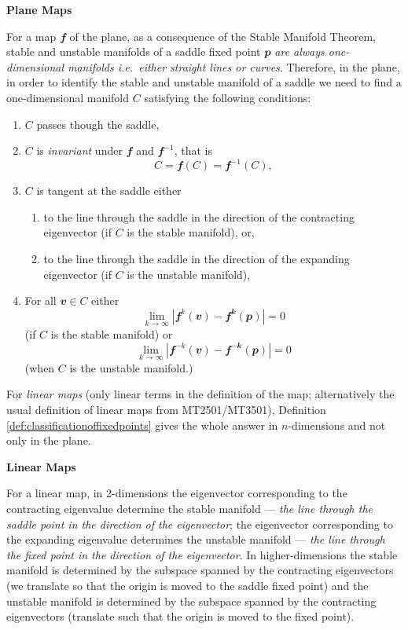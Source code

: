 \documentclass[
  a4paper,
  oneside,
  final]{krantz}
\providecommand{\tightlist}{%
  \setlength{\itemsep}{0pt}\setlength{\parskip}{0pt}}
\renewcommand{\v}[1]{{\mathbfit{#1}}}
\theoremstyle{definition}
\theoremstyle{definition}
\theoremstyle{definition}
\theoremstyle{definition}
\theoremstyle{remark}
\begin{document}
\begin{palegreenbox}

\textbf{Plane Maps}

For a map \(\v{f}\) of the plane, as a consequence of the Stable Manifold Theorem, stable and unstable manifolds of a saddle fixed point \(\v{p}\) \emph{are always one-dimensional manifolds i.e.~either straight lines or curves}. Therefore, in the plane, in order to identify the stable and unstable manifold of a saddle we need to find a one-dimensional manifold \(C\) satisfying the following conditions:

\begin{enumerate}
\def\labelenumi{\arabic{enumi}.}
\tightlist
\item
  \(C\) passes though the saddle,
\item
  \(C\) is \emph{invariant} under \(\v{f}\) and \(\v{f}^{-1}\), that is
  \[C = \v{f}(C) = \v{f}^{-1}(C),\]
\item
  \(C\) is tangent at the saddle either

  \begin{enumerate}
  \def\labelenumii{\roman{enumii}.}
  \tightlist
  \item
    to the line through the saddle in the direction of the contracting eigenvector (if \(C\) is the stable manifold), or,
  \item
    to the line through the saddle in the direction of the expanding eigenvector (if \(C\) is the unstable manifold),
  \end{enumerate}
\item
  For all \(\v{v} \in C\) either
  \[\lim_{k \to \infty} |\v{f}^{k}(\v{v}) - \v{f^{k}}(\v{p})| = 0\] (if \(C\) is the stable manifold) or
  \[\lim_{k \to \infty} |\v{f}^{-k}(\v{v}) - \v{f^{-k}}(\v{p})| = 0\]
  (when \(C\) is the unstable manifold.)
\end{enumerate}

\end{palegreenbox}

For \emph{linear maps} (only linear terms in the definition of the map; alternatively the usual definition of linear maps from MT2501/MT3501), Definition \ref{def:classificationoffixedpoints} gives the whole answer in \(n\)-dimensions and not only in the plane.

\begin{palegreenbox}

\textbf{Linear Maps}

For a linear map, in 2-dimensions the eigenvector corresponding to the contracting eigenvalue determine the stable manifold --- \emph{the line through the saddle point in the direction of the eigenvector}; the eigenvector corresponding to the expanding eigenvalue determines the unstable manifold --- \emph{the line through the fixed point in the direction of the eigenvector}. In higher-dimensions the stable manifold is determined by the subspace spanned by the contracting eigenvectors (we translate so that the origin is moved to the saddle fixed point) and the unstable manifold is determined by the subspace spanned by the contracting eigenvectors (translate such that the origin is moved to the fixed point).

\end{palegreenbox}
\end{document}
